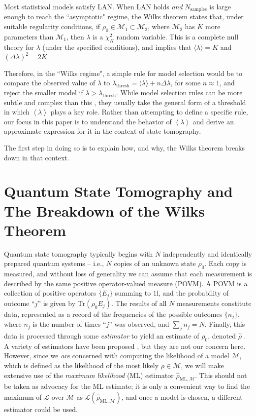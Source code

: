 \documentclass[aps,pra, twocolumn]{revtex4-1}
\newcommand{\M}{\mathcal{M}}
\newcommand{\Tr}{\mathrm{Tr}}
\newcommand{\cL}{\mathcal{L}}
\newcommand{\Id}{\mathbb{I}}
\newcommand{\expect}[1]{\ensuremath{\left\langle#1\right\rangle}}
\def\Id{1\!\mathrm{l}}
\newcommand{\rhohat}{\hat{\rho}}
\newcommand{\rhoML}[1]{\rhohat_{\scriptscriptstyle{\mathrm{ML},#1}}}
\begin{document}
Most statistical models satisfy LAN.  When LAN holds \emph{and} $N_{\mathrm{samples}}$ is large enough to reach the ``asymptotic" regime, the Wilks theorem states that, under suitable regularity conditions, if $\rho_{0}\in \M_{1}\subset \M_{2}$, where $\M_{2}$ has $K$ more parameters than $\M_{1}$, then $\lambda$ is a $\chi^{2}_{K}$ random variable.  This is a complete null theory for $\lambda$ (under the specified conditions), and implies that $\langle \lambda \rangle = K$ and $(\Delta \lambda)^{2} = 2K$.

Therefore, in the ``Wilks regime", a simple rule for model selection would be to compare the observed value of $\lambda$ to $\lambda_{\mathrm{thresh}} = \langle \lambda \rangle + n\Delta \lambda$, for some $n \approx 1$, and reject the smaller model if $\lambda > \lambda_{\mathrm{thresh}}$.  While model selection rules can be more subtle and complex than this \cite{Akaike1974, Schwarz1978, Kass1995, Spiegelhalter2002}, they usually take the general form of a threshold in which $\expect{\lambda}$ plays a key role.  Rather than attempting to define a specific rule, our focus in this paper is to understand the behavior of $\expect{\lambda}$ and derive an approximate expression for it in the context of state tomography.

The first step in doing so is to explain how, and why, the Wilks theorem breaks down in that context.

\section{Quantum State Tomography and The Breakdown of the Wilks Theorem}
\label{sec:qstmodelselection}
Quantum state tomography typically begins with $N$ independently and identically prepared quantum systems -- i.e., $N$ copies of an unknown state $\rho_{0}$.  Each copy is measured, and without loss of generality we can assume that each measurement is described by the same positive operator-valued measure (POVM).  A POVM is a collection of positive operators $\{E_j\}$ summing to $\Id$, and the probability of outcome ``$j$'' is given by $\Tr(\rho_0 E_j)$.  The results of all $N$ measurements constitute data, represented as a record of the frequencies of the possible outcomes $\{n_{j}\}$, where $n_{j}$ is the number of times ``$j$'' was observed, and $\sum_{j}n_{j} = N$.  Finally, this data is processed through some \emph{estimator} to yield an estimate of $\rho_0$, denoted $\hat{\rho}$ .  A variety of estimators have been proposed \cite{Vogel1989,Hradil1997,JamesPRA2001,Blume-Kohout2010b,Blume-Kohout2010,Zhu2014a,Ferrie2016}, but they are not our concern here.  However, since we \emph{are} concerned with computing the likelihood of a model $\M$, which is defined as the likelihood of the most likely $\rho\in\M$, we will make extensive use of the \emph{maximum likelihood} (ML) estimator $\rhoML{\M}$.  This should not be taken as advocacy for the ML estimate; it is only a convenient way to find the maximum of $\cL$ over $\M$ as $\mathcal{L}(\rhoML{\M})$, and once a model is chosen, a different estimator could be used.
\end{document}
